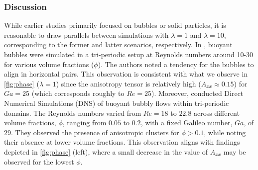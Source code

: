 \subsubsection*{Discussion}
While earlier studies primarily focused on bubbles or solid particles, it is reasonable to draw parallels between simulations with $\lambda = 1$ and $\lambda = 10$, corresponding to the former and latter scenarios, respectively. In \citet{bunner2002dynamics}, buoyant bubbles were simulated in a tri-periodic setup at Reynolds numbers around 10-30 for various volume fractions ($\phi$). The authors noted a tendency for the bubbles to align in horizontal pairs. %
This observation is consistent with what we observe in \ref{fig:phase} ($\lambda = 1$) since the anisotropy tensor is relatively high ($A_{xx} \approx 0.15$) for $Ga = 25$ (which corresponds roughly to $Re = 25$). 
Moreover, \citet{zhang2021direct} conducted Direct Numerical Simulations (DNS) of buoyant bubbly flows within tri-periodic domains. The Reynolds numbers varied from $Re=18$ to $22.8$ across different volume fractions, $\phi$, ranging from $0.05$ to $0.2$, with a fixed Galileo number, $Ga$, of $29$. They observed the presence of anisotropic clusters for $\phi > 0.1$, while noting their absence at lower volume fractions. This observation aligns with findings depicted in \ref{fig:phase} (left), where a small decrease in the value of $A_{xx}$ may be observed for the lowest $\phi$.

